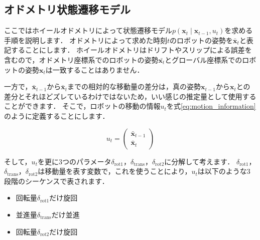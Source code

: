 \documentclass[{../../master}]{subfiles}
\begin{document}
\subsection{オドメトリ状態遷移モデル}
\label{sec:motion_model_odometry}

ここではホイールオドメトリによって状態遷移モデル$p(\bm{x}_{t} \mid \bm{x}_{t-1}, u_{t})$を求める手順を説明します．
オドメトリによって求めた時刻$t$のロボットの姿勢を$\bar{\bm{x}}_{t}$と表記することにします．
ホイールオドメトリはドリフトやスリップによる誤差を含むので，オドメトリ座標系でのロボットの姿勢$\bar{\bm{x}_{t}}$とグローバル座標系でのロボットの姿勢$\bm{x}_{t}$は一致することはありません．

一方で，$\bar{\bm{x}}_{t-1}$から$\bar{\bm{x}}_{t}$までの相対的な移動量の差分は，真の姿勢$\bm{x}_{t-1}$から$\bm{x}_{t}$との差分とそれほどズレているわけではないため，いい感じの推定量として使用することができます．
そこで，ロボットの移動の情報$u_{t}$を式\ref{eq:motion_information}のように定義することにします．

\begin{equation}
  u_{t} =
  \begin{pmatrix}
    \bar{\bm{x}}_{t-1} \\
    \bar{\bm{x}}_{t}
  \end{pmatrix}
  \label{eq:motion_information}
\end{equation}

そして，$u_{t}$を更に3つのパラメータ$\delta_{\text{rot}1}$，$\delta_{\text{trans}}$，$\delta_{\text{rot}2}$に分解して考えます．
$\delta_{\text{rot}1}$，$\delta_{\text{trans}}$，$\delta_{\text{rot}2}$は移動量を表す変数で，これを使うことにより，$u_{t}$は以下のような3段階のシーケンスで表されます．

\begin{itemize}
  \item 回転量$\delta_{\text{rot}1}$だけ旋回
  \item 並進量$\delta_{\text{trans}}$だけ並進
  \item 回転量$\delta_{\text{rot}2}$だけ旋回
\end{itemize}
\end{document}
